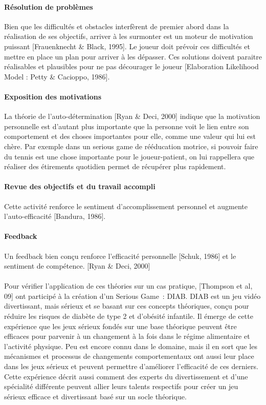 			\paragraph{Résolution de problèmes \\ \quad}
Bien que les difficultés et obstacles interfèrent de premier abord dans la réalisation de ses objectifs, arriver à les surmonter est un moteur de motivation puissant [Frauenknecht \& Black, 1995]. Le joueur doit prévoir ces difficultés et mettre en place un plan pour arriver à les dépasser. Ces solutions doivent paraitre réalisables et plausibles pour ne pas décourager le joueur [Elaboration Likelihood Model : Petty \& Cacioppo, 1986].
			\paragraph{Exposition des motivations \\ \quad}
La théorie de l’auto-détermination [Ryan \& Deci, 2000] indique que la motivation personnelle est d’autant plus importante que la personne voit le lien entre son comportement et des choses importantes pour elle, comme une valeur qui lui est chère. Par exemple dans un serious game de rééducation motrice, si pouvoir faire du tennis est une chose importante pour le joueur-patient, on lui rappellera que réaliser des étirements quotidien permet de récupérer plus rapidement.
			\paragraph{Revue des objectifs et du travail accompli\\ \quad}
Cette activité renforce le sentiment d’accomplissement personnel et augmente l’auto-efficacité [Bandura, 1986].
			\paragraph{Feedback \\ \quad}
Un feedback bien conçu renforce l’efficacité personnelle [Schuk, 1986] et le sentiment de compétence. [Ryan \& Deci, 2000]
			
\paragraph{}
Pour vérifier l'application de ces théories sur un cas pratique, [Thompson et al, 09] ont participé à la création d'un Serious Game~: DIAB. DIAB est un jeu vidéo divertissant, mais sérieux et se basant sur ces concepts théoriques, conçu pour réduire les risques de diabète de type 2 et d’obésité infantile. Il émerge de cette expérience que les jeux sérieux fondés sur une base théorique peuvent être efficaces pour parvenir à un changement à la fois dans le régime alimentaire et l’activité physique. Peu est encore connu dans le domaine, mais il en sort que les mécanismes et processus de changements comportementaux ont aussi leur place dans les jeux sérieux et peuvent permettre d'améliorer l'efficacité de ces derniers. Cette expérience décrit aussi comment des experts du divertissement et d'une spécialité différente peuvent allier leurs talents respectifs pour créer un jeu sérieux efficace et divertissant basé sur un socle théorique. 

